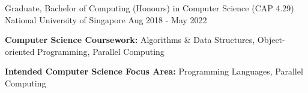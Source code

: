 

\begin{cventries}

  \cventry
    {Graduate, Bachelor of Computing (Honours) in Computer Science (CAP 4.29)} %
    {National University of Singapore} %
    {} %
    {Aug 2018 - May 2022} %
    {
      \begin{cvitems} %
        \item {\textbf{Computer Science Coursework:} Algorithms \& Data Structures, Object-oriented Programming, Parallel Computing}
        \item {\textbf{Intended Computer Science Focus Area:} Programming Languages, Parallel Computing}
      \end{cvitems}
    }

\end{cventries}
